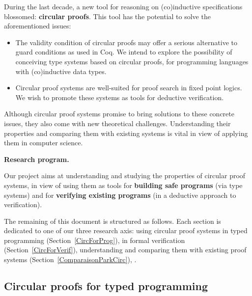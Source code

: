 \documentclass[11pt,twocolumn]{article}
\begin{document}
During the last decade, a new tool for reasoning on (co)inductive specifications blossomed: \textbf{circular proofs}. This tool has the potential to solve the aforementioned issues:



\begin{itemize}
\item 
The validity condition of circular proofs may offer a serious alternative to guard conditions as used in Coq. We intend to explore the possibility of conceiving type systems based on circular proofs, for programming languages with (co)inductive data types.
  
\item 
Circular proof systems are well-suited for proof search in fixed point logics. We wish to promote these systems as tools for deductive verification.
\end{itemize}

Although circular proof systems promise to bring solutions to these concrete issues, they also come with new theoretical challenges. Understanding their properties and comparing them with existing systems is vital in view of applying them in computer science.


\medskip
\begin{center}
\begin{bclogo}[logo= ,arrondi = 0.1, couleur = green!10,  epBarre = 0]{}
  \vspace{-10pt}
  \textbf{Research program.}
  
  
Our project aims at understanding and studying the properties of circular proof systems, in view of using them as tools for \textbf{building safe programs} (via type systems) and for \textbf{verifying existing programs} (in a deductive approach to verification).
 
\end{bclogo}
\end{center}

The remaining of this document is structured as follows.
Each section is dedicated to one of our three research axis: using circular proof systems in typed programming (Section~\ref{CircForProg}), in formal verification (Section~\ref{CircForVerif}), understanding and comparing them with existing proof systems (Section~\ref{ComparaisonParkCirc}), .


\subsection{Circular proofs for typed programming}~\label{CircForProg}
\end{document}
